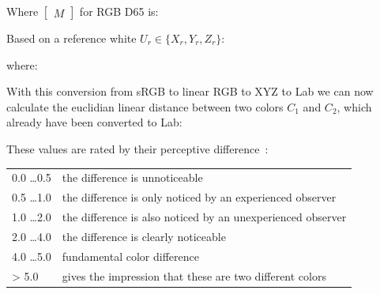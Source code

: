 Where $\begin{bmatrix}M\end{bmatrix}$ for RGB D65 is:


Based on a reference white $U_r \in \{X_r, Y_r, Z_r\}$:



where:





With this conversion from sRGB to linear RGB to XYZ to Lab we can now calculate 
the euclidian linear distance between two colors $C_1$ and $C_2$, which already 
have been converted to Lab:


These values are rated by their perceptive difference \cite{mokrzycki:2012}:

\begin{tabular}{l | l}
	0.0 \dots 0.5 & the difference is unnoticeable \\
	0.5 \dots 1.0 & the difference is only noticed by an experienced observer \\
	1.0 \dots 2.0 & the difference is also noticed by an unexperienced observer 
	\\
	2.0 \dots 4.0 & the difference is clearly noticeable \\
	4.0 \dots 5.0 & fundamental color difference  \\
	> 5.0 		  & gives the impression that these are two different 
	colors        
\end{tabular}

